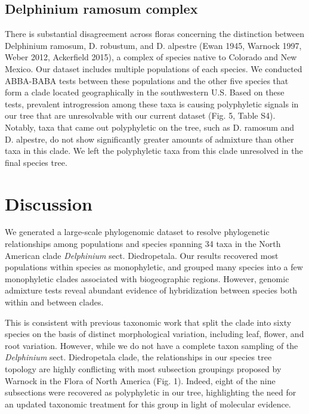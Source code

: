 \documentclass[11pt]{article}
\begin{document}
\subsection{Delphinium ramosum complex}
There is substantial disagreement across floras concerning the distinction between Delphinium ramosum, D. robustum, and D. alpestre (Ewan 1945, Warnock 1997, Weber 2012, Ackerfield 2015), a complex of species native to Colorado and New Mexico. Our dataset includes multiple populations of each species. We conducted ABBA-BABA tests between these populations and the other five species that form a clade located geographically in the southwestern U.S. Based on these tests, prevalent introgression among these taxa is causing polyphyletic signals in our tree that are unresolvable with our current dataset (Fig. 5, Table S4). Notably, taxa that came out polyphyletic on the tree, such as D. ramosum and D. alpestre, do not show significantly greater amounts of admixture than other taxa in this clade. We left the polyphyletic taxa from this clade unresolved in the final species tree.




\section{Discussion}

We generated a large-scale phylogenomic dataset to resolve phylogenetic relationships 
among populations and species spanning 34 taxa in the North American clade \emph{Delphinium}
sect. Diedropetala. Our results recovered most populations within species as monophyletic,
and grouped many species into a few monophyletic clades associated with biogeographic regions.
However, genomic admixture tests reveal abundant evidence of hybridization between species both
within and between clades. 

This is consistent with previous taxonomic work that split the clade into sixty species 
on the basis of distinct morphological variation, including leaf, flower, and root variation.
However, while we do not have a complete taxon sampling of the \emph{Delphinium} sect. 
Diedropetala clade, the relationships in our species tree topology are highly conflicting 
with most subsection groupings proposed by Warnock in the Flora of North America (Fig. 1).
Indeed, eight of the nine subsections were recovered as polyphyletic in our tree, 
highlighting the need for an updated taxonomic treatment for this group in light of
molecular evidence.
\end{document}
